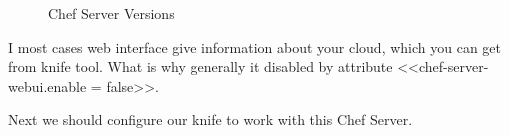 \begin{figure}[ht!]
  \caption{Chef Server Versions}
  \label{fig:chef-server-versions}
\end{figure}

I most cases web interface give information about your cloud, which you can get from knife tool. What is why generally it disabled by attribute <<chef-server-webui.enable = false>>.

Next we should configure our knife to work with this Chef Server.
